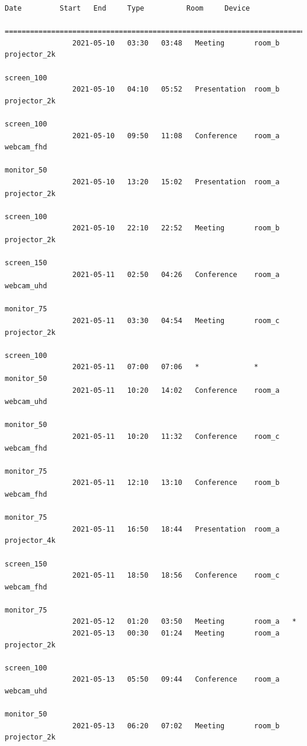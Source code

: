 \documentclass{article}
\begin{document}
\begin{Verbatim}[gobble=8]
                Date         Start   End     Type          Room     Device
                ===========================================================================
                2021-05-10   03:30   03:48   Meeting       room_b   projector_2k
                                                                    screen_100
                2021-05-10   04:10   05:52   Presentation  room_b   projector_2k
                                                                    screen_100
                2021-05-10   09:50   11:08   Conference    room_a   webcam_fhd
                                                                    monitor_50
                2021-05-10   13:20   15:02   Presentation  room_a   projector_2k
                                                                    screen_100
                2021-05-10   22:10   22:52   Meeting       room_b   projector_2k
                                                                    screen_150
                2021-05-11   02:50   04:26   Conference    room_a   webcam_uhd
                                                                    monitor_75
                2021-05-11   03:30   04:54   Meeting       room_c   projector_2k
                                                                    screen_100
                2021-05-11   07:00   07:06   *             *        monitor_50
                2021-05-11   10:20   14:02   Conference    room_a   webcam_uhd
                                                                    monitor_50
                2021-05-11   10:20   11:32   Conference    room_c   webcam_fhd
                                                                    monitor_75
                2021-05-11   12:10   13:10   Conference    room_b   webcam_fhd
                                                                    monitor_75
                2021-05-11   16:50   18:44   Presentation  room_a   projector_4k
                                                                    screen_150
                2021-05-11   18:50   18:56   Conference    room_c   webcam_fhd
                                                                    monitor_75
                2021-05-12   01:20   03:50   Meeting       room_a   *
                2021-05-13   00:30   01:24   Meeting       room_a   projector_2k
                                                                    screen_100
                2021-05-13   05:50   09:44   Conference    room_a   webcam_uhd
                                                                    monitor_50
                2021-05-13   06:20   07:02   Meeting       room_b   projector_2k

\end{Verbatim}
\end{document}
